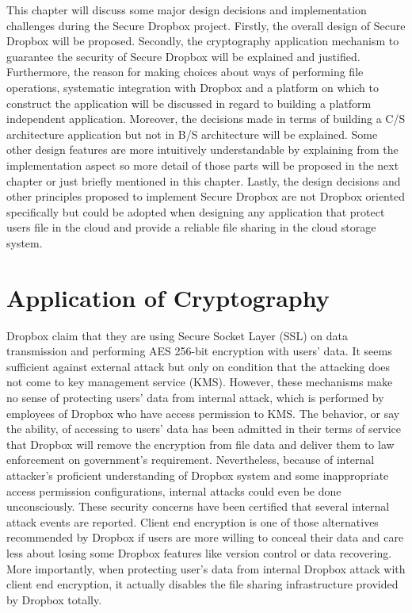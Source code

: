 This chapter will discuss some major design decisions and implementation challenges during the Secure Dropbox project. Firstly, the overall design of Secure Dropbox will be proposed. Secondly, the cryptography application mechanism to guarantee the security of Secure Dropbox will be explained and justified. Furthermore, the reason for making choices about ways of performing file operations, systematic integration with Dropbox and a platform on which to construct the application will be discussed in regard to building a platform independent application. Moreover, the decisions made in terms of building a C/S architecture application but not in B/S architecture will be explained. Some other design features are more intuitively understandable by explaining from the implementation aspect so more detail of those parts will be proposed in the next chapter or just briefly mentioned in this chapter. Lastly, the design decisions and other principles proposed to implement Secure Dropbox are not Dropbox oriented specifically but could be adopted when designing any application that protect users file in the cloud and provide a reliable file sharing in the cloud storage system.

\section{Application of Cryptography}

Dropbox claim that they are using Secure Socket Layer (SSL) on data transmission and performing AES 256-bit encryption with users’ data. It seems sufficient against external attack but only on condition that the attacking does not come to key management service (KMS). However, these mechanisms make no sense of protecting users’ data from internal attack, which is performed by employees of Dropbox who have access permission to KMS. The behavior, or say the ability, of accessing to users’ data has been admitted in their terms of service\cite{Dropbox2012} that Dropbox will remove the encryption from file data and deliver them to law enforcement on government’s requirement. Nevertheless, because of internal attacker’s proficient understanding of Dropbox system and some inappropriate access permission configurations, internal attacks could even be done unconsciously. These security concerns have been certified that several internal attack events are reported. Client end encryption is one of those alternatives recommended by Dropbox if users are more willing to conceal their data and care less about losing some Dropbox features like version control or data recovering\cite{Dropbox2012}. More importantly, when protecting user’s data from internal Dropbox attack with client end encryption, it actually disables the file sharing infrastructure provided by Dropbox totally.


